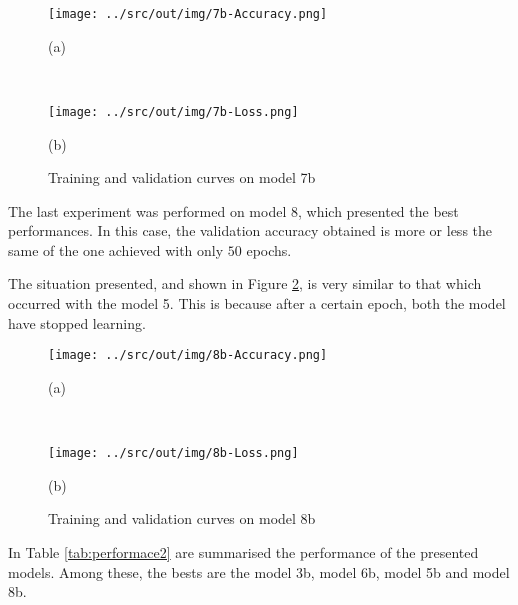 \documentclass[a4paper,12pt]{article} %
\begin{document}
	\begin{figure}[H]
		\begin{minipage}[c]{.49\textwidth}
			\centering
			\texttt{[image: ../src/out/img/7b-Accuracy.png]}
			\caption*{(a)}
		\end{minipage}
		~
		\begin{minipage}[c]{.49\textwidth}
			\centering
			\texttt{[image: ../src/out/img/7b-Loss.png]}
			\caption*{(b)}
		\end{minipage}
		\caption{Training and validation curves on model 7b}
		\label{fig:model7b-performance}
	\end{figure}

	The last experiment was performed on model 8, which presented the best 
	performances. In this case, the validation accuracy obtained is more or 
	less the same of the one achieved with only $50$ epochs. 
	
	The situation presented, and shown in Figure \ref{fig:model8b-performance}, 
	is very similar to that which occurred with the model 5. This is because 
	after a certain epoch, both the model have stopped learning.
	
	\begin{figure}[H]
		\begin{minipage}[c]{.49\textwidth}
			\centering
			\texttt{[image: ../src/out/img/8b-Accuracy.png]}
			\caption*{(a)}
		\end{minipage}
		~
		\begin{minipage}[c]{.49\textwidth}
			\centering
			\texttt{[image: ../src/out/img/8b-Loss.png]}
			\caption*{(b)}
		\end{minipage}
		\caption{Training and validation curves on model 8b}
		\label{fig:model8b-performance}
	\end{figure}

	In Table \ref{tab:performace2} are summarised the performance of the 
	presented models. Among these, the bests are the model 3b, 
	model 6b, model 5b and model 8b. 
\end{document}
